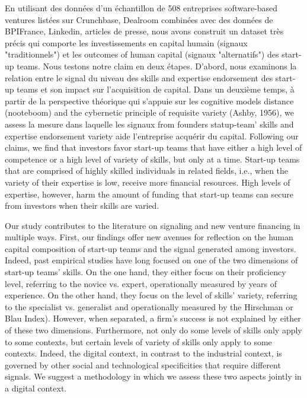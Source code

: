 \documentclass[12pt]{article}
\begin{document}
En utilisant des données d'un échantillon de 508 entreprises software-based ventures listées sur Crunchbase, Dealroom combinées avec des données de BPIFrance, Linkedin, articles de presse, nous avons construit un dataset très précis qui comporte les investissements en capital humain (signaux "traditionnels") et les outcomes of human capital (signaux "alternatifs") des start-up teams. Nous testons notre claim en deux étapes. D'abord, nous examinons la relation entre le signal du niveau des skills and expertise endorsement des start-up teams et son impact sur l'acquisition de capital. Dans un deuxième temps, à partir de la perspective théorique qui s'appuie sur les cognitive models distance (nooteboom) and the cybernetic principle of requisite variety (Ashby, 1956), we assess la mesure dans laquelle les signaux from founders statup-team' skills and expertise endorsement variety aide l'entreprise acquérir du capital. Following our claims, we find that investors favor start-up teams that have either a high level of competence or a high level of variety of skills, but only at a time. Start-up teams that are comprised of highly skilled individuals in related fields, i.e., when the variety of their expertise is low, receive more financial resources. High levels of expertise, however, harm the amount of funding that start-up teams can secure from investors when their skills are varied.

Our study contributes to the literature on signaling and new venture financing in multiple ways. First, our findings offer new avenues for reflection on the human capital composition of start-up teams and the signal generated among investors. Indeed, past empirical studies have long focused on one of the two dimensions of start-up teams' skills. On the one hand, they either focus on their proficiency level, referring to the novice vs. expert, operationally measured by years of experience. On the other hand, they focus on the level of skills' variety, referring to the specialist vs. generalist and operationally measured by the Hirschman or Blau Index). However, when separated, a firm's success is not explained by either of these two dimensions. Furthermore, not only do some levels of skills only apply to some contexts, but certain levels of variety of skills only apply to some contexts. Indeed, the digital context, in contrast to the industrial context, is governed by other social and technological specificities that require different signals. We suggest a methodology in which we assess these two aspects jointly in a digital context.
\end{document}
